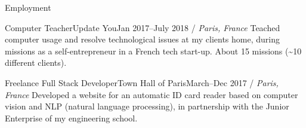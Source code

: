 \documentclass[]{mcdowellcv}
\begin{document}
\begin{cvsection}{Employment}
        \begin{cvsubsection}{Computer Teacher}{Update You}{Jan 2017--July 2018 / \textit{Paris, France}}
            Teached computer usage and resolve technological issues at my clients home, during missions as a self-entrepreneur in a French tech start-up.
            About 15 missions (\textasciitilde 10 different clients).
        \end{cvsubsection}

        \begin{cvsubsection}{Freelance Full Stack Developer}{Town Hall of Paris}{March--Dec 2017 / \textit{Paris, France}}
            Developed a website for an automatic ID card reader based on computer vision and NLP (natural language processing), in partnership with the Junior Enterprise of my engineering school.
        \end{cvsubsection}

    \end{cvsection}
\end{document}
